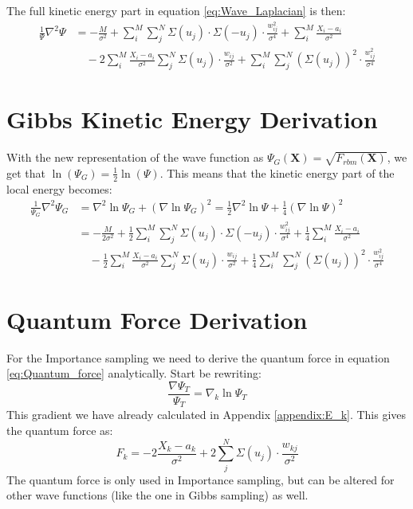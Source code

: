 \documentclass[12pt,a4paper,english]{article}
\begin{document}
The full kinetic energy part in equation \ref{eq:Wave_Laplacian} is then:
\begin{align*}
\frac{1}{\Psi}\nabla^2\Psi&= -\frac{M}{\sigma^2} +\sum_{i}^{M}\sum_{j}^{N}\Sigma(u_j)\cdot\Sigma(-u_j)\cdot\frac{w_{ij}^2}{\sigma^4} +\sum_{i}^{M}\frac{X_i-a_i}{\sigma^2}\\ 
&\quad -2\sum_{i}^{M}\frac{X_i-a_i}{\sigma^2}\sum_{j}^{N}\Sigma(u_j)\cdot\frac{w_{ij}}{\sigma^2} 
+\sum_{i}^{M}\sum_{j}^{N}(\Sigma(u_j))^2\cdot\frac{w_{ij}^2}{\sigma^4}
\end{align*}

\section{Gibbs Kinetic Energy Derivation}
\label{appendix:Gibbs_Ek}
With the new representation of the wave function as $\Psi_G(\textbf{X})=\sqrt{F_{rbm}(\textbf{X})}$, we get that $\ln(\Psi_G)=\frac{1}{2}\ln(\Psi)$. This means that the kinetic energy part of the local energy becomes:
\begin{align*}
\frac{1}{\Psi_G}\nabla^2\Psi_G&=\nabla^2\ln\Psi_G + (\nabla\ln\Psi_G)^2 =\frac{1}{2}\nabla^2\ln\Psi + \frac{1}{4}(\nabla\ln\Psi)^2\\
&=-\frac{M}{2\sigma^2} +\frac{1}{2}\sum_{i}^{M}\sum_{j}^{N}\Sigma(u_j)\cdot\Sigma(-u_j)\cdot\frac{w_{ij}^2}{\sigma^4} +\frac{1}{4}\sum_{i}^{M}\frac{X_i-a_i}{\sigma^2}\\ 
&\quad -\frac{1}{2}\sum_{i}^{M}\frac{X_i-a_i}{\sigma^2}\sum_{j}^{N}\Sigma(u_j)\cdot\frac{w_{ij}}{\sigma^2} 
+\frac{1}{4}\sum_{i}^{M}\sum_{j}^{N}(\Sigma(u_j))^2\cdot\frac{w_{ij}^2}{\sigma^4}
\end{align*}

\section{Quantum Force Derivation}
\label{appendix:Quantum_force}
For the Importance sampling we need to derive the quantum force in equation \ref{eq:Quantum_force} analytically. Start be rewriting:
\begin{equation*}
\frac{\nabla\Psi_T}{\Psi_T}=\nabla_k\ln\Psi_T
\end{equation*}
This gradient we have already calculated in Appendix \ref{appendix:E_k}. This gives the quantum force as:
\begin{equation}
\label{eq:Quantum_force_derived}
F_k=-2\frac{X_k-a_k}{\sigma^2} + 2\sum_{j}^{N}\Sigma(u_j)\cdot\frac{w_{kj}}{\sigma^2}
\end{equation}
The quantum force is only used in Importance sampling, but can be altered for other wave functions (like the one in Gibbs sampling) as well.



\end{document}
